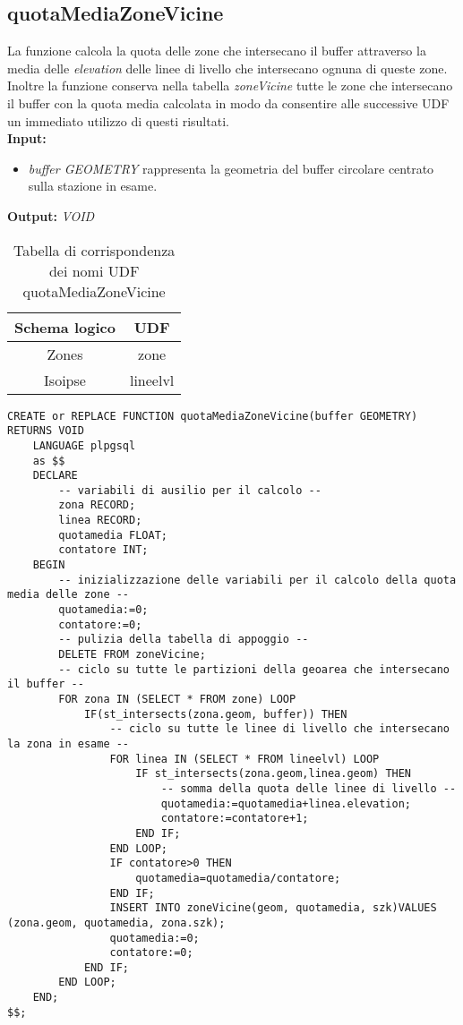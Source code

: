 \subsection{quotaMediaZoneVicine}
La funzione calcola la quota delle zone che intersecano il buffer attraverso la media delle \textit{elevation} delle linee di livello che intersecano ognuna di queste zone. Inoltre la funzione conserva nella tabella \textit{zoneVicine} tutte le zone che intersecano il buffer con la quota media calcolata in modo da consentire alle successive UDF un immediato utilizzo di questi risultati.\\
\textbf{Input:} 
\begin{itemize}
\item \textit{buffer GEOMETRY} rappresenta la geometria del buffer circolare centrato sulla stazione in esame.
\end{itemize}
\textbf{Output:} \textit{VOID} 

\begin{table}[h]
\centering
\caption{Tabella di corrispondenza dei nomi UDF quotaMediaZoneVicine}
\label{mapTb1}
\begin{tabular}{|c|c|}
\hline
Schema logico & UDF      \\ \hline
Zones         & zone     \\
Isoipse       & lineelvl \\ \hline
\end{tabular}
\end{table}

\begin{lstlisting}[style=mySQL]
CREATE or REPLACE FUNCTION quotaMediaZoneVicine(buffer GEOMETRY) RETURNS VOID
	LANGUAGE plpgsql
	as $$
	DECLARE
		-- variabili di ausilio per il calcolo --
		zona RECORD;
		linea RECORD;
		quotamedia FLOAT;
		contatore INT;
	BEGIN
		-- inizializzazione delle variabili per il calcolo della quota media delle zone --
		quotamedia:=0;
		contatore:=0;
		-- pulizia della tabella di appoggio --
		DELETE FROM zoneVicine;
		-- ciclo su tutte le partizioni della geoarea che intersecano il buffer --
		FOR zona IN (SELECT * FROM zone) LOOP
			IF(st_intersects(zona.geom, buffer)) THEN
				-- ciclo su tutte le linee di livello che intersecano la zona in esame --
				FOR linea IN (SELECT * FROM lineelvl) LOOP
					IF st_intersects(zona.geom,linea.geom) THEN
						-- somma della quota delle linee di livello --
						quotamedia:=quotamedia+linea.elevation;
						contatore:=contatore+1;
					END IF;
				END LOOP;
				IF contatore>0 THEN
					quotamedia=quotamedia/contatore;
				END IF;
				INSERT INTO zoneVicine(geom, quotamedia, szk)VALUES (zona.geom, quotamedia, zona.szk);
				quotamedia:=0;
				contatore:=0;
			END IF;
		END LOOP;
	END;
$$;
\end{lstlisting}

